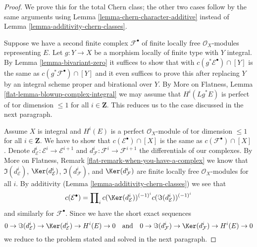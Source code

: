 \begin{proof}
We prove this for the total Chern class; the other two cases follow
by the same arguments using
Lemma \ref{lemma-chern-character-additive}
instead of
Lemma \ref{lemma-additivity-chern-classes}.

\medskip\noindent
Suppose we have a second finite complex
$\mathcal{F}^\bullet$ of finite locally free $\mathcal{O}_X$-modules
representing $E$.
Let $g : Y \to X$ be a morphism locally of finite type with $Y$ integral.
By Lemma \ref{lemma-bivariant-zero} it suffices to show that
with $c(g^*\mathcal{E}^\bullet) \cap [Y]$ is the same as
$c(g^*\mathcal{F}^\bullet) \cap [Y]$ and it even suffices to prove
this after replacing $Y$ by an integral scheme proper and birational
over $Y$. By
More on Flatness, Lemma \ref{flat-lemma-blowup-complex-integral}
we may assume that $H^i(Lg^*E)$ is perfect of tor dimension $\leq 1$
for all $i \in \mathbf{Z}$.
This reduces us to the case discussed in the next paragraph.

\medskip\noindent
Assume $X$ is integral and $H^i(E)$ is a perfect $\mathcal{O}_X$-module
of tor dimension $\leq 1$ for all $i \in \mathbf{Z}$. We have to
show that $c(\mathcal{E}^\bullet) \cap [X]$ is the same as
$c(\mathcal{F}^\bullet) \cap [X]$. Denote
$d_\mathcal{E}^i : \mathcal{E}^i \to \mathcal{E}^{i + 1}$ and
$d_\mathcal{F}^i : \mathcal{F}^i \to \mathcal{F}^{i + 1}$
the differentials of our complexes. By
More on Flatness, Remark \ref{flat-remark-when-you-have-a-complex}
we know that $\Im(d_\mathcal{E}^i)$, $\Ker(d_\mathcal{E}^i)$,
$\Im(d_\mathcal{F}^i)$, and $\Ker(d_\mathcal{F}^i)$
are finite locally free $\mathcal{O}_X$-modules for all $i$.
By additivity (Lemma \ref{lemma-additivity-chern-classes}) we see that
$$
c(\mathcal{E}^\bullet) = \prod\nolimits_i
c(\Ker(d_\mathcal{E}^i))^{(-1)^i} c(\Im(d_\mathcal{E}^i))^{(-1)^i}
$$
and similarly for $\mathcal{F}^\bullet$. Since we have the
short exact sequences
$$
0 \to \Im(d_\mathcal{E}^i) \to \Ker(d_\mathcal{E}^i) \to H^i(E) \to 0
\quad\text{and}\quad
0 \to \Im(d_\mathcal{F}^i) \to \Ker(d_\mathcal{F}^i) \to H^i(E) \to 0
$$
we reduce to the problem stated and solved in the next paragraph.


\end{proof}
